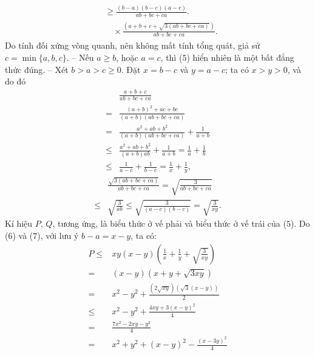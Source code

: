 \begin{multicols}{2}
\begin{align*}
		&\ge \frac{{\left( {b - a} \right)\left( {b - c} \right)\left( {a - c} \right)}}{{ab + bc + ca}}.\\
		&\quad\times \frac{\left( {a + b + c + \sqrt {3\left( {ab + bc + ca} \right)} } \right)}{{ab + bc + ca}}.
	\end{align*}
	Do tính đối xứng vòng quanh, nên không mất tính tổng quát, giả sử $c = \min\{a, b, c\}$.
	\vskip 0.05cm
	-- Nếu $a \ge b$, hoặc $a = c$, thì ($5$) hiển nhiên là một bất đẳng thức đúng.
	\vskip 0.05cm
	-- Xét $b > a > c \ge 0$.
	\vskip 0.05cm
	Đặt $x = b - c$ và $y = a - c$; ta có $x > y > 0$, và do đó
	\begin{align*}
			&\frac{{a + b + c}}{{ab + bc + ca}} \\
			=& \frac{{{{\left( {a + b} \right)}^2} + ac + bc}}{{\left( {a + b} \right)\left( {ab + bc + ca} \right)}}\\
			 =& \frac{{{a^2} + ab + {b^2}}}{{\left( {a + b} \right)\left( {ab + bc + ca} \right)}} + \frac{1}{{a + b}}\\
			 \le& \frac{{{a^2} + ab + {b^2}}}{{\left( {a + b} \right)ab}} + \frac{1}{{a + b}} = \frac{1}{a} + \frac{1}{b}\\
			\le& \frac{1}{{a - c}} + \frac{1}{{b - c}} = \frac{1}{x} + \frac{1}{y}, \tag{$6$}
	\end{align*}
	\begin{align*}
		&\frac{{\sqrt {3\left( {ab + bc + ca} \right)} }}{{ab + bc + ca}} = \sqrt {\frac{3}{{ab + bc + ca}}}  \\
		\le &\sqrt {\frac{3}{{ab}}}  \le \sqrt {\frac{3}{{\left( {a - c} \right)\left( {b - c} \right)}}}  = \sqrt {\frac{3}{{xy}}} . \tag{$7$}
	\end{align*}
	Kí hiệu $P$, $Q$, tương ứng, là biểu thức ở vế phải và biểu thức ở vế trái của ($5$).
	\vskip 0.05cm
	Do ($6$) và ($7$), với lưu ý $b - a = x - y$, ta có:
	\begin{align*}
			P \le& xy\left( {x - y} \right)\left( {\frac{1}{x} + \frac{1}{y} + \sqrt {\frac{3}{{xy}}} } \right)\\
			 = \,&\left( {x - y} \right)\left( {x + y + \sqrt {3xy} } \right) \\
			 = \,&{x^2} - {y^2} + \frac{{\left( {2\sqrt {xy} } \right)\left( {\sqrt 3 \left( {x - y} \right)} \right)}}{2}\\
			 \le\,& {x^2} - {y^2} + \frac{{4xy + 3{{\left( {x - y} \right)}^2}}}{4} \\
			= \,&\frac{{7{x^2} - 2xy - {y^2}}}{4} \\
			= \,&{x^2} + {y^2} + {\left( {x - y} \right)^2} - \frac{{{{\left( {x - 3y} \right)}^2}}}{4}\\

\end{align*}
\end{multicols}
